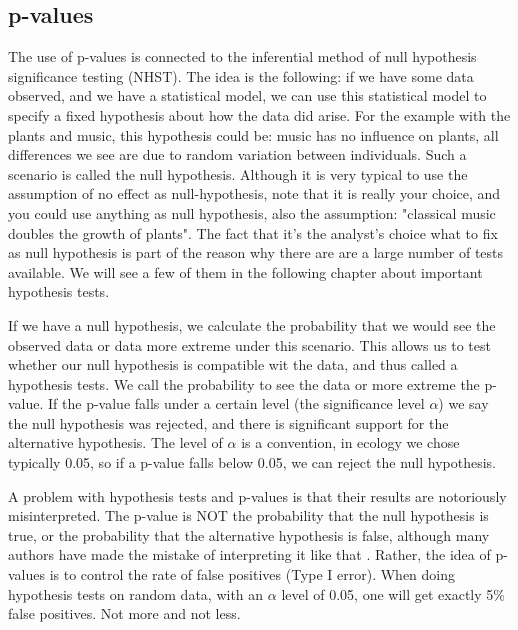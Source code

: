 \documentclass[a4paper,twoside]{tufte-book} %
\begin{document}
\subsection{p-values}

The use of p-values is connected to the inferential method of null hypothesis significance testing (NHST). The idea is the following: if we have some data observed, and we have a statistical model, we can use this statistical model to specify a fixed hypothesis about how the data did arise. For the example with the plants and music, this hypothesis could be: music has no influence on plants, all differences we see are due to random variation between individuals. Such a scenario is called the null hypothesis.  Although it is very typical to use the assumption of no effect as null-hypothesis, note that it is really your choice, and you could use anything as null hypothesis, also the assumption: "classical music doubles the growth of plants". The fact that it's the analyst's choice what to fix as null hypothesis is part of the reason why there are are a large number of tests available. We will see a few of them in the following chapter about important hypothesis tests.

If we have a null hypothesis, we calculate the probability that we would see the observed data or data more extreme under this scenario. This allows us to test whether our null hypothesis is compatible wit the data, and thus called a hypothesis tests. We call the probability to see the data or more extreme the p-value.  If the p-value falls under a certain level (the significance level $\alpha$) we say the null hypothesis was rejected, and there is significant support for the alternative hypothesis. The level of $\alpha$ is a convention, in ecology we chose typically 0.05, so if a p-value falls below 0.05, we can reject the null hypothesis.  

A problem with hypothesis tests and p-values is that their results are notoriously misinterpreted. The p-value is NOT the probability that the null hypothesis is true, or the probability that the alternative hypothesis is false, although many authors have made the mistake of interpreting it like that \citep[][]{Cohen-earthisround-1994}. Rather, the idea of p-values is to control the rate of false positives (Type I error). When doing hypothesis tests on random data, with an $\alpha$ level of 0.05, one will get exactly 5\% false positives. Not more and not less.  
\end{document}
